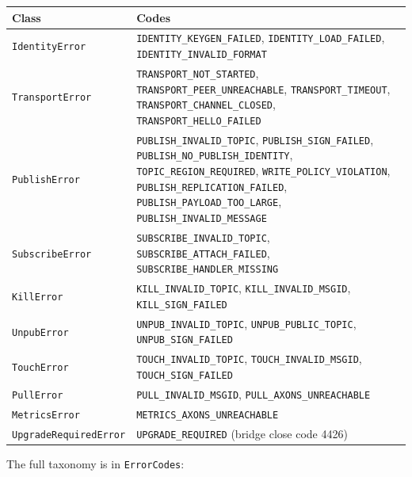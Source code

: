 \documentclass[
  nobib]{tufte-handout}
\newcounter{none} %
\begin{document}
{\def\LTcaptype{none} %
\begin{longtable}[]{@{}
  >{\raggedright\arraybackslash}p{}
  >{\raggedright\arraybackslash}p{}@{}}
\toprule\noalign{}
\begin{minipage}[b]{\linewidth}\raggedright
Class
\end{minipage} & \begin{minipage}[b]{\linewidth}\raggedright
Codes
\end{minipage} \\
\midrule\noalign{}
\endhead
\bottomrule\noalign{}
\endlastfoot
\texttt{IdentityError} & \texttt{IDENTITY\_KEYGEN\_FAILED},
\texttt{IDENTITY\_LOAD\_FAILED}, \texttt{IDENTITY\_INVALID\_FORMAT} \\
\texttt{TransportError} & \texttt{TRANSPORT\_NOT\_STARTED},
\texttt{TRANSPORT\_PEER\_UNREACHABLE}, \texttt{TRANSPORT\_TIMEOUT},
\texttt{TRANSPORT\_CHANNEL\_CLOSED},
\texttt{TRANSPORT\_HELLO\_FAILED} \\
\texttt{PublishError} & \texttt{PUBLISH\_INVALID\_TOPIC},
\texttt{PUBLISH\_SIGN\_FAILED}, \texttt{PUBLISH\_NO\_PUBLISH\_IDENTITY},
\texttt{TOPIC\_REGION\_REQUIRED}, \texttt{WRITE\_POLICY\_VIOLATION},
\texttt{PUBLISH\_REPLICATION\_FAILED},
\texttt{PUBLISH\_PAYLOAD\_TOO\_LARGE},
\texttt{PUBLISH\_INVALID\_MESSAGE} \\
\texttt{SubscribeError} & \texttt{SUBSCRIBE\_INVALID\_TOPIC},
\texttt{SUBSCRIBE\_ATTACH\_FAILED},
\texttt{SUBSCRIBE\_HANDLER\_MISSING} \\
\texttt{KillError} & \texttt{KILL\_INVALID\_TOPIC},
\texttt{KILL\_INVALID\_MSGID}, \texttt{KILL\_SIGN\_FAILED} \\
\texttt{UnpubError} & \texttt{UNPUB\_INVALID\_TOPIC},
\texttt{UNPUB\_PUBLIC\_TOPIC}, \texttt{UNPUB\_SIGN\_FAILED} \\
\texttt{TouchError} & \texttt{TOUCH\_INVALID\_TOPIC},
\texttt{TOUCH\_INVALID\_MSGID}, \texttt{TOUCH\_SIGN\_FAILED} \\
\texttt{PullError} & \texttt{PULL\_INVALID\_MSGID},
\texttt{PULL\_AXONS\_UNREACHABLE} \\
\texttt{MetricsError} & \texttt{METRICS\_AXONS\_UNREACHABLE} \\
\texttt{UpgradeRequiredError} & \texttt{UPGRADE\_REQUIRED} (bridge close
code 4426) \\
\end{longtable}
}

The full taxonomy is in \texttt{ErrorCodes}:
\end{document}
